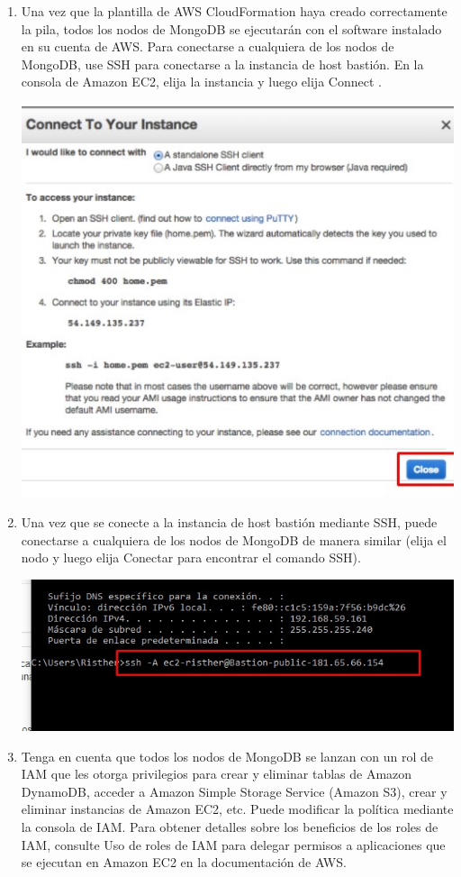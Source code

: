 \documentclass[12pt,letterpaper]{article}
\begin{document}
\begin{enumerate}
\begin{enumerate}
		\item Una vez que la plantilla de AWS CloudFormation haya creado correctamente la pila, todos los nodos de MongoDB se ejecutarán con el software instalado en su cuenta de AWS. Para conectarse a cualquiera de los nodos de MongoDB, use SSH para conectarse a la instancia de host bastión. En la consola de Amazon EC2, elija la instancia y luego elija Connect .
	\begin{center}
		\includegraphics[width=14cm]{./img/3.1.jpg} 
	\end{center}
		\item Una vez que se conecte a la instancia de host bastión mediante SSH, puede conectarse a cualquiera de los nodos de MongoDB de manera similar (elija el nodo y luego elija Conectar para encontrar el comando SSH). 

		\begin{center}
			\includegraphics[width=14cm]{./img/3.2.jpg} 
		\end{center}
		\item
		 Tenga en cuenta que todos los nodos de MongoDB se lanzan con un rol de IAM que les otorga privilegios para crear y eliminar tablas de Amazon DynamoDB, acceder a Amazon Simple Storage Service (Amazon S3), crear y eliminar instancias de Amazon EC2, etc. Puede modificar la política mediante la consola de IAM. Para obtener detalles sobre los beneficios de los roles de IAM, consulte Uso de roles de IAM para delegar permisos a aplicaciones que se ejecutan en Amazon EC2 en la documentación de AWS. 
	

\end{enumerate}
\end{enumerate}
\end{document}
